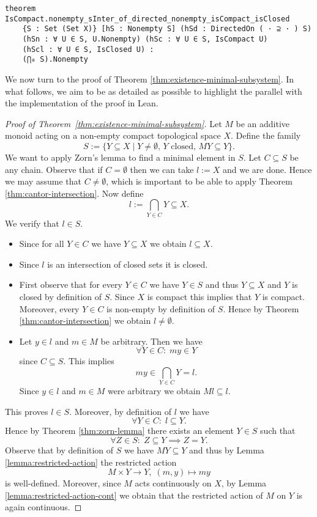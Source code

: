 \documentclass[11pt]{article}
\theoremstyle{definition}              %
\theoremstyle{definition}              %
\theoremstyle{definition}              %
\begin{document}
\begin{lstlisting}
theorem IsCompact.nonempty_sInter_of_directed_nonempty_isCompact_isClosed
    {S : Set (Set X)} [hS : Nonempty S] (hSd : DirectedOn ( · ⊇ · ) S) 
    (hSn : ∀ U ∈ S, U.Nonempty) (hSc : ∀ U ∈ S, IsCompact U) 
    (hScl : ∀ U ∈ S, IsClosed U) : 
    (⋂₀ S).Nonempty 
\end{lstlisting}

We now turn to the proof of Theorem \ref{thm:existence-minimal-subsystem}. In what follows, we aim to be as detailed as possible to highlight the parallel with the implementation of the proof in Lean.

\begin{proof}[Proof of Theorem~\ref{thm:existence-minimal-subsystem}]
Let $M$ be an additive monoid acting on a non-empty compact topological space $X$. Define the family 
\[
S := \{ Y \subseteq X \mid Y \neq \emptyset, \, Y \text{ closed}, \, M Y \subseteq Y \}.
\]
We want to apply Zorn's lemma to find a minimal element in $S$. 
Let $C \subseteq S$ be any chain.
Observe that if $C = \emptyset$ then we can take $l := X$ and we are done. Hence we may assume that $C \neq \emptyset$,
which is important to be able to apply Theorem \ref{thm:cantor-intersection}.
Now define
\[
l := \bigcap_{Y \in C} Y \subseteq X.
\]
We verify that $l \in S$. 

\begin{itemize}
  \item Since for all $Y \in C$ we have $Y \subseteq X$ we obtain $l \subseteq X$. 
  \item Since $l$ is an intersection of closed sets it is closed. 
  \item First observe that for every $Y \in C$ we have $Y \in S$ and thus $Y \subseteq X$ and $Y$ is closed 
    by definition of $S$. Since $X$ is compact this implies that $Y$ is compact. 
    Moreover, every $Y \in C$ is non-empty by definition of $S$.
    Hence by Theorem \ref{thm:cantor-intersection} we obtain $l \neq \emptyset$. 
  \item Let $y \in l$ and $m \in M$ be arbitrary. Then we have 
    \[
    \forall Y \in C: \; m y \in Y
    \]
    since $C \subseteq S$. This implies 
    \[
    m y \in \bigcap_{Y \in C} Y = l.  
    \]
    Since $y \in l$ and $m \in M$ were arbitrary we obtain $M l \subseteq l$.
\end{itemize}

This proves $l \in S$. Moreover, by definition of $l$ we have 
\[
\forall Y \in C: \; l \subseteq Y.
\]
Hence by Theorem \ref{thm:zorn-lemma} there exists an element $Y \in S$ such that 
\[
\forall Z \in S: \; Z \subseteq Y \implies Z = Y. \tag{1}
\]
Observe that by definition of $S$ we have $M Y \subseteq Y$ and thus by Lemma \ref{lemma:restricted-action}
the restricted action 
\[
M \times Y \to Y, \; (m, y) \mapsto m y
\]
is well-defined. Moreover, since $M$ acts continuously on $X$, by Lemma \ref{lemma:restricted-action-cont} 
we obtain that the restricted action of $M$ on $Y$ is again continuous. 


\end{proof}
\end{document}
